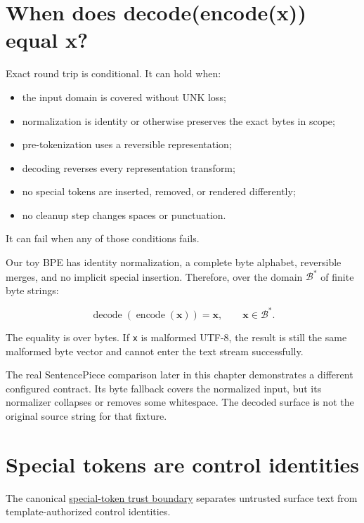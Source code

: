 \section{When does decode(encode(x)) equal
x?}\label{when-does-decodeencodex-equal-x}

Exact round trip is conditional. It can hold when:

\begin{itemize}
\tightlist
\item
  the input domain is covered without UNK loss;
\item
  normalization is identity or otherwise preserves the exact bytes in
  scope;
\item
  pre-tokenization uses a reversible representation;
\item
  decoding reverses every representation transform;
\item
  no special tokens are inserted, removed, or rendered differently;
\item
  no cleanup step changes spaces or punctuation.
\end{itemize}

It can fail when any of those conditions fails.

Our toy BPE has identity normalization, a complete byte alphabet,
reversible merges, and no implicit special insertion. Therefore, over
the domain \(\mathcal{B}^{*}\) of finite byte strings:

\begin{equation}
\operatorname{decode}(\operatorname{encode}(\mathbf{x}))=\mathbf{x},
\qquad \mathbf{x}\in\mathcal{B}^{*}.
\end{equation}

The equality is over bytes. If \texttt{x} is malformed UTF-8, the result
is still the same malformed byte vector and cannot enter the text stream
successfully.

The real SentencePiece comparison later in this chapter demonstrates a
different configured contract. Its byte fallback covers the normalized
input, but its normalizer collapses or removes some whitespace. The
decoded surface is not the original source string for that fixture.

\section{Special tokens are control
identities}\label{special-tokens-are-control-identities}

The canonical
\href{https://github.com/hermonai/inside-the-llm-engine/blob/astra-visual-rewrite/diagrams/tokenizer/special-token-trust-boundary.txt}{special-token
trust boundary} separates untrusted surface text from
template-authorized control identities.

